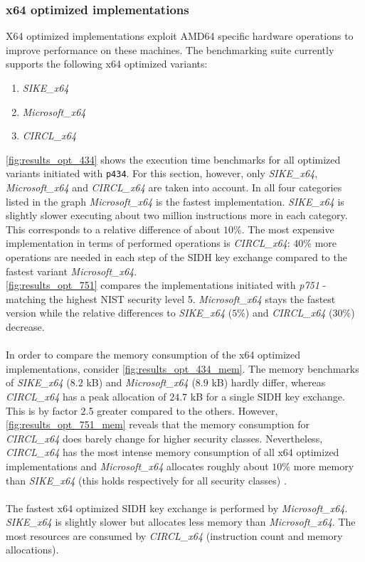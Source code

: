 \subsubsection{x64 optimized implementations}
\label{sec:analysis_x64}
X64 optimized implementations exploit AMD64 specific hardware operations to improve performance on these machines. The benchmarking suite currently supports the following x64 optimized variants:
\begin{enumerate}
\item \textit{SIKE\_x64}
\item \textit{Microsoft\_x64}
\item \textit{\gls{CIRCL}\_x64}
\end{enumerate}
\autoref{fig:results_opt_434} shows the execution time benchmarks for all optimized variants initiated with \texttt{p434}. For this section, however, only \textit{SIKE\_x64}, \textit{Microsoft\_x64} and \textit{\gls{CIRCL}\_x64} are taken into account. In all four categories listed in the graph \textit{Microsoft\_x64}  is the fastest implementation. \textit{SIKE\_x64} is slightly slower executing about two million instructions more in each category. This corresponds to a relative difference of about $10$\%. The most expensive implementation in terms of performed operations is \textit{\gls{CIRCL}\_x64}: $40$\% more operations are needed in each step of the \gls{SIDH} key exchange compared to the fastest variant \textit{Microsoft\_x64}.
\\
\autoref{fig:results_opt_751} compares the implementations initiated with \textit{p751} - matching the highest \gls{NIST} security level 5. \textit{Microsoft\_x64} stays the fastest version while the relative differences to \textit{SIKE\_x64} ($5$\%) and \textit{\gls{CIRCL}\_x64} ($30$\%) decrease.
\\\\
In order to compare the memory consumption of the x64 optimized implementations, consider \autoref{fig:results_opt_434_mem}. The memory benchmarks of \textit{SIKE\_x64} ($8.2$ \gls{kB}) and \textit{Microsoft\_x64} ($8.9$ \gls{kB}) hardly differ, whereas \textit{\gls{CIRCL}\_x64} has a peak allocation of $24.7$ \gls{kB} for a single \gls{SIDH} key exchange. This is by factor 2.5 greater compared to the others. However, \autoref{fig:results_opt_751_mem} reveals that the memory consumption for \textit{\gls{CIRCL}\_x64} does barely change for higher security classes. Nevertheless,  \textit{\gls{CIRCL}\_x64} has the most intense memory consumption of all x64 optimized implementations and \textit{Microsoft\_x64} allocates roughly about $10$\% more memory than \textit{SIKE\_x64} (this holds respectively for all security classes) .
\\\\
The fastest x64 optimized \gls{SIDH} key exchange is performed by \textit{Microsoft\_x64}. \textit{SIKE\_x64} is slightly slower but allocates less memory than \textit{Microsoft\_x64}. The most resources are consumed by \textit{\gls{CIRCL}\_x64} (instruction count and memory allocations).

